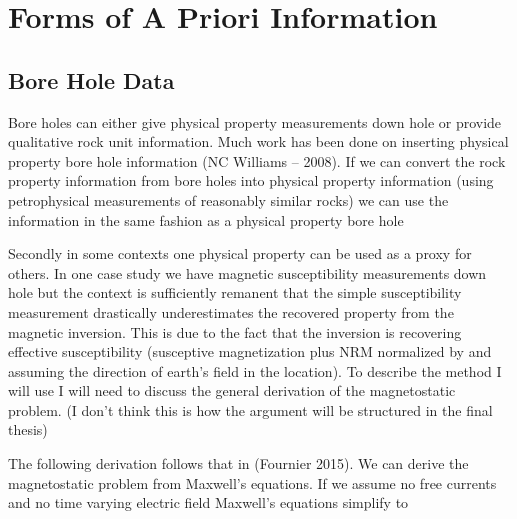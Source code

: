 \section{Forms of A Priori Information}
\label{sec:Forms of A Priori Information}

\subsection{Bore Hole Data}
\label{sec: Bore Hole Data}

Bore holes can either give physical property measurements down hole or provide qualitative rock unit information. Much work has been done on inserting physical property bore hole information (NC Williams – 2008). If we can convert the  rock property information from bore holes into physical property information (using petrophysical measurements of reasonably similar rocks) we can use the information in the same fashion as a physical property bore hole

Secondly in some contexts one physical property can be used as a proxy for others. In one case study we have magnetic susceptibility measurements down hole but the context is sufficiently remanent that the simple susceptibility measurement drastically underestimates the recovered property from the magnetic inversion. This is due to the fact that the inversion is recovering effective susceptibility (susceptive magnetization plus \ac{NRM} normalized by and assuming the direction of earth's field in the location). To describe the method I will use I will need to discuss the general derivation of the magnetostatic problem. (I don't think this is how the argument will be structured in the final thesis)

The following derivation follows that in (Fournier 2015). We can derive the magnetostatic problem from Maxwell's equations. If we assume no free currents and no time varying electric field Maxwell's equations simplify to 

